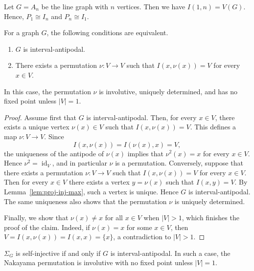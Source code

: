 \documentclass[a4paper,leqno]{amsart}
\begin{document}
\begin{eg}
Let $G=A_n$ be the line graph with $n$ vertices.  Then we have $I(1,n)=V(G)$.  Hence, $P_1\cong I_n$ and $P_n\cong I_1$.
\end{eg}

\begin{lem}\label{lem:interval-antipodal-involution}
For a graph $G$, the following conditions are equivalent.
\begin{enumerate}
\item $G$ is interval-antipodal.
\item There exists a permutation $\nu:V\to V$ such that
$I(x,\nu(x))=V$ for every $x\in V$.
\end{enumerate}
In this case, the permutation $\nu$ is involutive, uniquely determined, and has no fixed point unless $|V|=1$.
\end{lem}

\begin{proof}
Assume first that $G$ is interval-antipodal. Then, for every $x\in V$, there exists a unique vertex $\nu(x)\in V$ such that $I(x,\nu(x))=V$.
This defines a map $\nu:V\to V$. Since
$$I(x,\nu(x))=I(\nu(x),x)=V,$$
the uniqueness of the antipode of $\nu(x)$ implies that $\nu^2(x)=x$ for every $x\in V$. Hence $\nu^2=\operatorname{id}_V$, and in particular $\nu$ is a permutation.
Conversely, suppose that there exists a permutation $\nu:V\to V$ such that $I(x,\nu(x))=V$ for every $x\in V$. Then for every $x\in V$ there exists a vertex $y=\nu(x)$ such that $I(x,y)=V$. By Lemma~\ref{lem:proj-inj-max}, such a vertex is unique. Hence $G$ is interval-antipodal. 
The same uniqueness also shows that the permutation $\nu$ is uniquely determined.

Finally, we show that $\nu(x)\neq x$ for all $x\in V$ when $|V|>1$, which finishes the proof of the claim. Indeed, if $\nu(x)=x$ for some $x\in V$, then $V=I(x,\nu(x))=I(x,x)=\{x\}$, a contradiction to $|V|>1$.
\end{proof}

\begin{thm}\label{thm:self-inj}
$\Sigma_G$ is self-injective if and only if $G$ is interval-antipodal.
In such a case, the Nakayama permutation is involutive with no fixed point unless $|V|=1$.
\end{thm}
\end{document}
